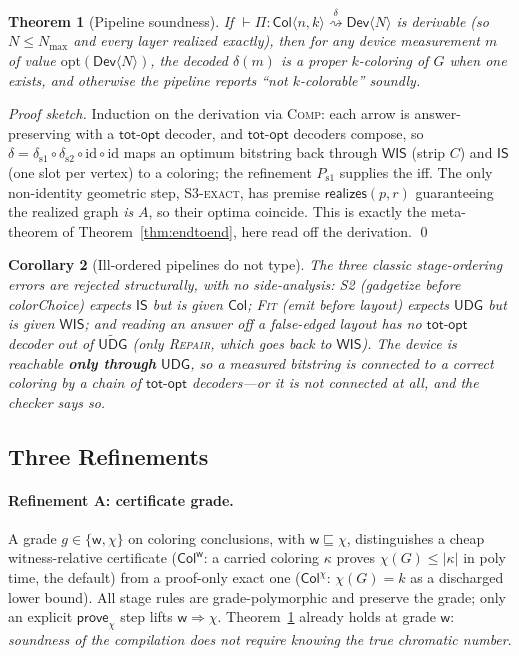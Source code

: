 \documentclass[11pt]{article}
\newtheorem{theorem}{Theorem}[section]
\newtheorem{corollary}[theorem]{Corollary}
\theoremstyle{definition}
\theoremstyle{remark}
\newcommand{\tCol}{\mathsf{Col}}
\newcommand{\tIS}{\mathsf{IS}}
\newcommand{\tWIS}{\mathsf{WIS}}
\newcommand{\tUDG}{\mathsf{UDG}}
\newcommand{\tUDGa}{\widetilde{\mathsf{UDG}}}
\newcommand{\tDev}{\mathsf{Dev}}
\newcommand{\Nmax}{N_{\max}}
\newcommand{\realizes}{\mathsf{realizes}}
\newcommand{\totopt}{\mathsf{tot\text{-}opt}}
\newcommand{\rn}[1]{\textsc{\footnotesize #1}}
\newcommand{\redto}[1]{\mathrel{\overset{\textstyle #1}{\rightsquigarrow}}}
\begin{document}
\begin{theorem}[Pipeline soundness]
\label{thm:typesound}
If $\vdash \Pi : \tCol\langle n,k\rangle \redto{\delta} \tDev\langle N\rangle$ is
derivable (so $N\le\Nmax$ and every layer realized \emph{exactly}), then for any
device measurement $m$ of value $\mathrm{opt}(\tDev\langle N\rangle)$, the decoded
$\delta(m)$ is a proper $k$-coloring of $G$ when one exists, and otherwise the
pipeline reports ``not $k$-colorable'' soundly.
\end{theorem}
\begin{proof}[Proof sketch]
Induction on the derivation via \rn{Comp}: each arrow is answer-preserving with a
$\totopt$ decoder, and $\totopt$ decoders compose, so
$\delta=\delta_{\mathrm{s1}}\!\circ\delta_{\mathrm{s2}}\!\circ\mathrm{id}\circ\mathrm{id}$
maps an optimum bitstring back through $\tWIS$ (strip $C$) and $\tIS$ (one slot per
vertex) to a coloring; the refinement $P_{\mathrm{s1}}$ supplies the iff. The only
non-identity geometric step, \rn{S3-exact}, has premise $\realizes(p,r)$
guaranteeing the realized graph \emph{is} $A$, so their optima coincide. This is
exactly the meta-theorem of Theorem~\ref{thm:endtoend}, here read off the
derivation. \qed
\end{proof}

\begin{corollary}[Ill-ordered pipelines do not type]
\label{cor:order}
The three classic stage-ordering errors are rejected structurally, with no
side-analysis: \rn{S2} (\emph{gadgetize before colorChoice}) expects $\tIS$ but is
given $\tCol$; \rn{Fit} (\emph{emit before layout}) expects $\tUDG$ but is given
$\tWIS$; and \emph{reading an answer off a false-edged layout} has no $\totopt$
decoder out of $\tUDGa$ (only \rn{Repair}, which goes \emph{back} to $\tWIS$). The
device is reachable \textbf{only through} $\tUDG$, so a measured bitstring is
connected to a correct coloring by a chain of $\totopt$ decoders---or it is not
connected at all, and the checker says so.
\end{corollary}

\subsection{Three Refinements}
\label{sec:refine}

\paragraph{Refinement A: certificate grade.} A grade
$g\in\{\mathsf{w},\chi\}$ on coloring conclusions, with
$\mathsf{w}\sqsubseteq\chi$, distinguishes a cheap witness-relative certificate
($\tCol^{\mathsf{w}}$: a carried coloring $\kappa$ proves $\chi(G)\le|\kappa|$ in
poly time, the default) from a proof-only exact one ($\tCol^{\chi}$: $\chi(G)=k$ as
a discharged lower bound). All stage rules are grade-polymorphic and preserve the
grade; only an explicit $\mathsf{prove}_\chi$ step lifts $\mathsf{w}\!\Rightarrow\!\chi$.
Theorem~\ref{thm:typesound} already holds at grade $\mathsf{w}$: \emph{soundness of
the compilation does not require knowing the true chromatic number}.
\end{document}
